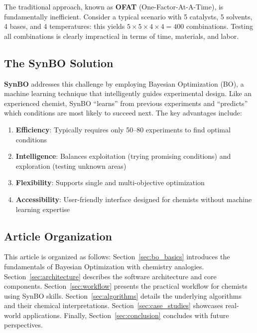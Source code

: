 \documentclass[12pt,a4paper]{article}
\begin{document}
The traditional approach, known as \textbf{OFAT} (One-Factor-At-A-Time), is fundamentally inefficient. Consider a typical scenario with 5 catalysts, 5 solvents, 4 bases, and 4 temperatures: this yields $5 \times 5 \times 4 \times 4 = 400$ combinations. Testing all combinations is clearly impractical in terms of time, materials, and labor.

\subsection{The SynBO Solution}

\textbf{SynBO} addresses this challenge by employing Bayesian Optimization (BO), a machine learning technique that intelligently guides experimental design. Like an experienced chemist, SynBO ``learns'' from previous experiments and ``predicts'' which conditions are most likely to succeed next. The key advantages include:

\begin{enumerate}
    \item \textbf{Efficiency}: Typically requires only 50--80 experiments to find optimal conditions
    \item \textbf{Intelligence}: Balances exploitation (trying promising conditions) and exploration (testing unknown areas)
    \item \textbf{Flexibility}: Supports single and multi-objective optimization
    \item \textbf{Accessibility}: User-friendly interface designed for chemists without machine learning expertise
\end{enumerate}

\subsection{Article Organization}

This article is organized as follows: Section~\ref{sec:bo_basics} introduces the fundamentals of Bayesian Optimization with chemistry analogies. Section~\ref{sec:architecture} describes the software architecture and core components. Section~\ref{sec:workflow} presents the practical workflow for chemists using SynBO skills. Section~\ref{sec:algorithms} details the underlying algorithms and their chemical interpretations. Section~\ref{sec:case_studies} showcases real-world applications. Finally, Section~\ref{sec:conclusion} concludes with future perspectives.

\end{document}
